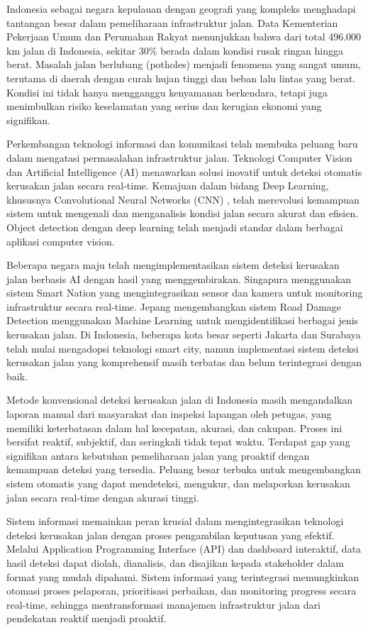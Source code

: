 \documentclass[12pt,a4paper]{article}
\begin{document}
Indonesia sebagai negara kepulauan dengan geografi yang kompleks menghadapi tantangan besar dalam pemeliharaan infrastruktur jalan. Data Kementerian Pekerjaan Umum dan Perumahan Rakyat menunjukkan bahwa dari total 496.000 km jalan di Indonesia, sekitar 30\% berada dalam kondisi rusak ringan hingga berat. Masalah jalan berlubang (potholes) menjadi fenomena yang sangat umum, terutama di daerah dengan curah hujan tinggi dan beban lalu lintas yang berat. Kondisi ini tidak hanya mengganggu kenyamanan berkendara, tetapi juga menimbulkan risiko keselamatan yang serius dan kerugian ekonomi yang signifikan.

Perkembangan teknologi informasi dan komunikasi telah membuka peluang baru dalam mengatasi permasalahan infrastruktur jalan. Teknologi Computer Vision dan Artificial Intelligence (AI) menawarkan solusi inovatif untuk deteksi otomatis kerusakan jalan secara real-time. Kemajuan dalam bidang Deep Learning, khususnya Convolutional Neural Networks (CNN) \cite{lecun2015}, telah merevolusi kemampuan sistem untuk mengenali dan menganalisis kondisi jalan secara akurat dan efisien. Object detection dengan deep learning \cite{zhao2019} telah menjadi standar dalam berbagai aplikasi computer vision.

Beberapa negara maju telah mengimplementasikan sistem deteksi kerusakan jalan berbasis AI dengan hasil yang menggembirakan. Singapura menggunakan sistem Smart Nation yang mengintegrasikan sensor dan kamera untuk monitoring infrastruktur secara real-time. Jepang mengembangkan sistem Road Damage Detection menggunakan Machine Learning untuk mengidentifikasi berbagai jenis kerusakan jalan. Di Indonesia, beberapa kota besar seperti Jakarta dan Surabaya telah mulai mengadopsi teknologi smart city, namun implementasi sistem deteksi kerusakan jalan yang komprehensif masih terbatas dan belum terintegrasi dengan baik.

Metode konvensional deteksi kerusakan jalan di Indonesia masih mengandalkan laporan manual dari masyarakat dan inspeksi lapangan oleh petugas, yang memiliki keterbatasan dalam hal kecepatan, akurasi, dan cakupan. Proses ini bersifat reaktif, subjektif, dan seringkali tidak tepat waktu. Terdapat gap yang signifikan antara kebutuhan pemeliharaan jalan yang proaktif dengan kemampuan deteksi yang tersedia. Peluang besar terbuka untuk mengembangkan sistem otomatis yang dapat mendeteksi, mengukur, dan melaporkan kerusakan jalan secara real-time dengan akurasi tinggi.

Sistem informasi memainkan peran krusial dalam mengintegrasikan teknologi deteksi kerusakan jalan dengan proses pengambilan keputusan yang efektif. Melalui Application Programming Interface (API) \cite{fielding2000} dan dashboard interaktif, data hasil deteksi dapat diolah, dianalisis, dan disajikan kepada stakeholder dalam format yang mudah dipahami. Sistem informasi yang terintegrasi memungkinkan otomasi proses pelaporan, prioritisasi perbaikan, dan monitoring progress secara real-time, sehingga mentransformasi manajemen infrastruktur jalan dari pendekatan reaktif menjadi proaktif.
\end{document}
